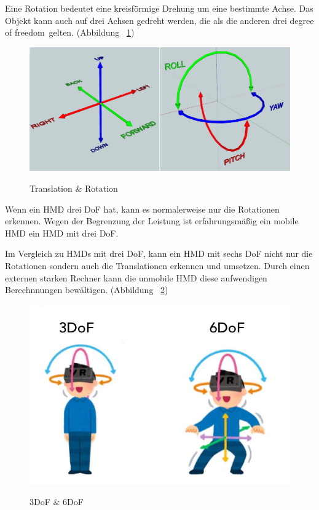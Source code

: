   Eine Rotation bedeutet eine kreisförmige Drehung um eine bestimmte Achse. Das Objekt kann auch auf drei Achsen gedreht werden, die als die anderen drei \glqq degree of freedom\grqq\ gelten. (Abbildung ~\ref{fig:translationRotation})

\begin{figure}[ht]
\vspace*{1em}
\centering
\caption{Translation \& Rotation}
\includegraphics[width=\textwidth]{images/translationRotation.png}
\label{fig:translationRotation} 
\end{figure}
  
  Wenn ein HMD drei DoF hat, kann es normalerweise nur die Rotationen erkennen. Wegen der Begrenzung der Leistung ist erfahrungsmäßig ein mobile HMD ein HMD mit drei DoF.
  
  Im Vergleich zu HMDs mit drei DoF, kann ein HMD mit sechs DoF nicht nur die Rotationen sondern auch die Translationen erkennen und umsetzen. Durch einen externen starken Rechner kann die unmobile HMD diese aufwendigen Berechnnungen bewältigen. (Abbildung ~\ref{fig:6DoF-vs-3DoF})
  
\begin{figure}[ht]
\vspace*{1em}
\centering
\caption{3DoF \& 6DoF}
\includegraphics[width=\textwidth]{images/6DoF-vs-3DoF.jpg}
\label{fig:6DoF-vs-3DoF} 
\end{figure}
  
